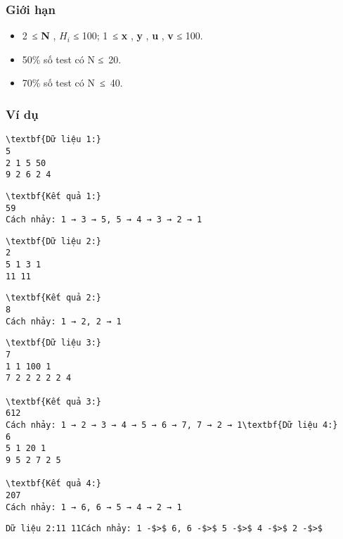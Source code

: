 \subsubsection{   Giới hạn  }
\begin{itemize}
	\item     2 ≤    \textbf{     N    }    ,    \textbf{     $H_{i}$}    ≤ 100; 1 ≤    \textbf{     x    }    ,    \textbf{     y    }    ,    \textbf{     u    }    ,    \textbf{     v    }    ≤ 100.   
	\item     50\% số test có N ≤ 20.   
	\item     70\% số test có N ≤ 40.   
\end{itemize}

\subsubsection{   Ví dụ  }
\begin{verbatim}
\textbf{Dữ liệu 1:}
5
2 1 5 50
9 2 6 2 4\end{verbatim}
\begin{verbatim}
\textbf{Kết quả 1:}
59
Cách nhảy: 1 → 3 → 5, 5 → 4 → 3 → 2 → 1\end{verbatim}
\begin{verbatim}
\textbf{Dữ liệu 2:}
2
5 1 3 1
11 11\end{verbatim}
\begin{verbatim}
\textbf{Kết quả 2:}
8
Cách nhảy: 1 → 2, 2 → 1\end{verbatim}
\begin{verbatim}
\textbf{Dữ liệu 3:}
7
1 1 100 1
7 2 2 2 2 2 4

\textbf{Kết quả 3:}
612
Cách nhảy: 1 → 2 → 3 → 4 → 5 → 6 → 7, 7 → 2 → 1\textbf{Dữ liệu 4:}
6
5 1 20 1
9 5 2 7 2 5

\textbf{Kết quả 4:}
207
Cách nhảy: 1 → 6, 6 → 5 → 4 → 2 → 1\end{verbatim}
\begin{verbatim}
Dữ liệu 2:11 11Cách nhảy: 1 -$>$ 6, 6 -$>$ 5 -$>$ 4 -$>$ 2 -$>$ \end{verbatim}
